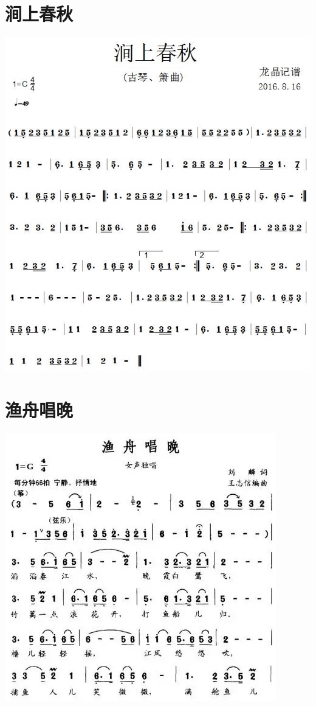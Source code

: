 \documentclass[cn,pad,twocol]{elegantbook}
\begin{document}
\section{涧上春秋}\includegraphics[width=\textwidth]{dongxiao/20200819/涧上春秋.jpeg}
\section{渔舟唱晚}\includegraphics[width=\textwidth]{dongxiao/20200819/渔舟唱晚.jpeg}
\end{document}
